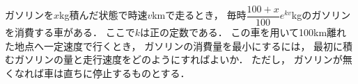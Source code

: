 \documentclass[../../main.tex]{subfiles}
\begin{document}
ガソリンを$x$kg積んだ状態で時速$v$kmで走るとき，
毎時$\displaystyle\dfrac{100+x}{100}e^{kv}$kgのガソリンを消費する車がある．
ここで$k$は正の定数である．
この車を用いて100km離れた地点へ一定速度で行くとき，
ガソリンの消費量を最小にするには，
最初に積むガソリンの量と走行速度をどのようにすればよいか．
ただし，
ガソリンが無くなれば車は直ちに停止するものとする．
\end{document}
